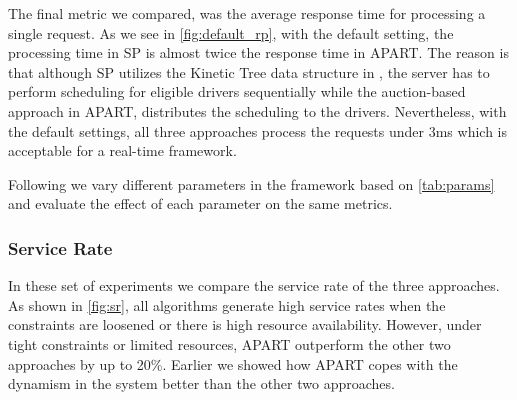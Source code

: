 The final metric we compared, was the average response time for processing a single request. As we see in \cref{fig:default_rp}, with the default setting, the processing time in SP is almost twice the response time in APART. The reason is that although SP utilizes the Kinetic Tree data structure in \cite{Huang14}, the server has to perform scheduling for eligible drivers sequentially while the auction-based approach in APART, distributes the scheduling to the drivers. Nevertheless, with the default settings, all three approaches process the requests under 3ms which is acceptable for a real-time framework.

Following we vary different parameters in the framework based on \cref{tab:params} and evaluate the effect of each parameter on the same metrics.

\subsubsection{Service Rate}
In these set of experiments we compare the service rate of the three approaches. As shown in \cref{fig:sr}, all algorithms generate high service rates when the constraints are loosened or there is high resource availability. However, under tight constraints or limited resources, APART outperform the other two approaches by up to 20\%. Earlier we showed how APART copes with the dynamism in the system better than the other two approaches.

